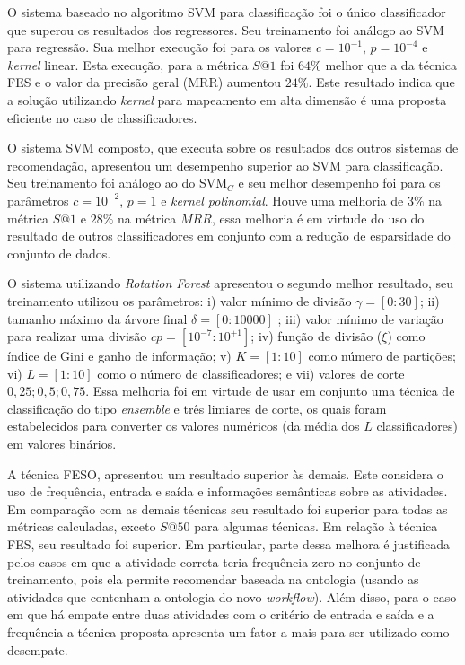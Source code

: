 \documentclass[10pt]{article}
\begin{document}
O sistema baseado no algoritmo SVM para classificação foi o único classificador que superou os resultados dos regressores. Seu treinamento foi análogo ao SVM para regressão. Sua melhor execução foi para os valores \(c = 10^{-1}\), \(p = 10^{-4}\) e \emph{kernel} linear. Esta execução, para a métrica \(S@1\) foi \(64\%\) melhor que a da técnica FES e o valor da precisão geral (MRR) aumentou \(24\%\). Este resultado indica que a solução utilizando \emph{kernel} para mapeamento em alta dimensão é uma proposta eficiente no caso de classificadores.

O sistema SVM composto, que executa sobre os resultados dos outros sistemas de recomendação, apresentou um desempenho superior ao SVM para classificação. Seu treinamento foi análogo ao do SVM\(_{C}\) e seu melhor desempenho foi para os parâmetros \(c = 10^{-2}\), \(p = 1\) e \emph{kernel polinomial}. Houve uma melhoria de \(3\%\) na métrica \(S@1\) e \(28\%\) na métrica \(MRR\), essa melhoria é em virtude do uso do resultado de outros classificadores em conjunto com a redução de esparsidade do conjunto de dados.

O sistema utilizando \emph{Rotation Forest} apresentou o segundo melhor resultado, seu treinamento utilizou os parâmetros: i) valor mínimo de divisão \(\gamma = [0:30]\); ii) tamanho máximo da árvore final \(\delta = [0:10000]\) ; iii) valor mínimo de variação para realizar uma divisão \(cp = [10^{-7}:10^{+1}]\); iv) função de divisão (\(\xi\)) como índice de Gini e ganho de informação; v) \(K = [1:10]\) como número de partições; vi) \(L = [1:10]\) como o número de classificadores; e vii) valores de corte \(0,25; 0,5; 0,75\). Essa melhoria foi em virtude de usar em conjunto uma técnica de classificação do tipo \emph{ensemble} e três limiares de corte, os quais foram estabelecidos para converter os valores numéricos (da média dos \(L\) classificadores) em valores binários.

A técnica FESO, apresentou um resultado superior às demais. Este  considera o uso de frequência, entrada e saída e informações semânticas sobre as atividades. Em comparação com as demais técnicas seu resultado foi superior para todas as métricas calculadas, exceto \(S@50\) para algumas técnicas. Em relação à técnica FES, seu resultado foi superior. Em particular, parte dessa melhora é justificada pelos casos em que a atividade correta teria frequência zero no conjunto de treinamento, pois ela permite recomendar baseada na ontologia (usando as atividades que contenham a ontologia do novo \emph{workflow}). Além disso, para o caso em que há empate entre duas atividades com o critério de entrada e saída e a frequência a técnica proposta apresenta um fator a mais para ser utilizado como desempate.
\end{document}
